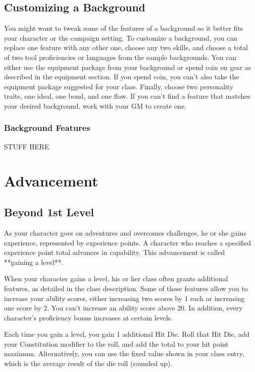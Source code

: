 \subsection{Customizing a Background} 

You might want to tweak some of the features of a background so it better fits your character or the campaign setting. To customize a background, you can replace one feature with any other one, choose any two skills, and choose a total of two tool proficiencies or languages from the sample backgrounds. You can either use the equipment package from your background or spend coin on gear as described in the equipment section. If you spend coin, you can't also take the equipment package suggested for your class. Finally, choose two personality traits, one ideal, one bond, and one flaw. If you can't find a feature that matches your desired background, work with your GM to create one.

\subsubsection{Background Features} 
STUFF HERE

\section{Advancement}\label{sec:advancement}
\subsection{Beyond 1st Level}\label{subsec:beyond-first-level}

As your character goes on adventures and overcomes challenges, he or she gains experience, represented by experience points. A character who reaches a specified experience point total advances in capability. This advancement is called **gaining a level**.

When your character gains a level, his or her class often grants additional features, as detailed in the class description. Some of these features allow you to increase your ability scores, either increasing two scores by 1 each or increasing one score by 2. You can't increase an ability score above 20. In addition, every character's proficiency bonus increases at certain levels.

Each time you gain a level, you gain 1 additional Hit Die. Roll that Hit Die, add your Constitution modifier to the roll, and add the total to your hit point maximum. Alternatively, you can use the fixed value shown in your class entry, which is the average result of the die roll (rounded up).

